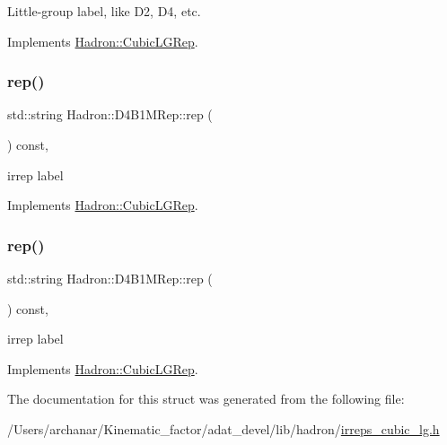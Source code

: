 Little-\/group label, like D2, D4, etc. 

Implements \mbox{\hyperlink{structHadron_1_1CubicLGRep_a9bdb14b519a611d21379ed96a3a9eb41}{Hadron\+::\+Cubic\+L\+G\+Rep}}.

\mbox{\label{structHadron_1_1D4B1MRep_a8bcd49be46064fc4ee93c98a36a3da8d}} 
\subsubsection{\texorpdfstring{rep()}{rep()}\hspace{0.1cm}{\footnotesize\ttfamily [1/2]}}
{\footnotesize\ttfamily std\+::string Hadron\+::\+D4\+B1\+M\+Rep\+::rep (\begin{DoxyParamCaption}{ }\end{DoxyParamCaption}) const\hspace{0.3cm}{\ttfamily [inline]}, {\ttfamily [virtual]}}

irrep label 

Implements \mbox{\hyperlink{structHadron_1_1CubicLGRep_a50f5ddbb8f4be4cee0106fa9e8c75e6c}{Hadron\+::\+Cubic\+L\+G\+Rep}}.

\mbox{\label{structHadron_1_1D4B1MRep_a8bcd49be46064fc4ee93c98a36a3da8d}} 
\subsubsection{\texorpdfstring{rep()}{rep()}\hspace{0.1cm}{\footnotesize\ttfamily [2/2]}}
{\footnotesize\ttfamily std\+::string Hadron\+::\+D4\+B1\+M\+Rep\+::rep (\begin{DoxyParamCaption}{ }\end{DoxyParamCaption}) const\hspace{0.3cm}{\ttfamily [inline]}, {\ttfamily [virtual]}}

irrep label 

Implements \mbox{\hyperlink{structHadron_1_1CubicLGRep_a50f5ddbb8f4be4cee0106fa9e8c75e6c}{Hadron\+::\+Cubic\+L\+G\+Rep}}.



The documentation for this struct was generated from the following file\+:\begin{DoxyCompactItemize}
\item 
/\+Users/archanar/\+Kinematic\+\_\+factor/adat\+\_\+devel/lib/hadron/\mbox{\hyperlink{lib_2hadron_2irreps__cubic__lg_8h}{irreps\+\_\+cubic\+\_\+lg.\+h}}\end{DoxyCompactItemize}
